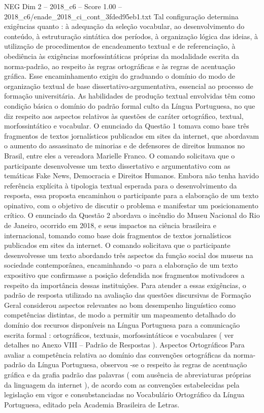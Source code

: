 \begin{textsample}{NEG Dim 2 – 2018\_c6 – Score 1.00 – 2018\_c6/enade\_2018\_ci\_cont\_3fded95eb1.txt}
Tal configuração determina exigências quanto : à adequação da seleção vocabular, ao desenvolvimento do conteúdo, à estruturação sintática dos períodos, à organização lógica das ideias, à utilização de procedimentos de encadeamento textual e de referenciação, à obediência às exigências morfossintáticas próprias da modalidade escrita da norma-padrão, ao respeito às regras ortográficas e às regras de acentuação gráfica.
Esse encaminhamento exigiu do graduando o domínio do modo de organização textual de base dissertativo-argumentativa, essencial ao processo de formação universitária.
As habilidades de produção textual envolvidas têm como condição básica o domínio do padrão formal culto da Língua Portuguesa, no que diz respeito aos aspectos relativos às questões de caráter ortográfico, textual, morfossintático e vocabular.
O enunciado da Questão 1 tomava como base três fragmentos de textos jornalísticos publicados em sites da internet, que abordavam o aumento do assassinato de minorias e de defensores de direitos humanos no Brasil, entre eles a vereadora Marielle Franco.
O comando solicitava que o participante desenvolvesse um texto dissertativo e argumentativo com as temáticas Fake News, Democracia e Direitos Humanos.
Embora não tenha havido referência explícita à tipologia textual esperada para o desenvolvimento da resposta, essa proposta encaminhou o participante para a elaboração de um texto opinativo, com o objetivo de discutir o problema e manifestar um posicionamento crítico.
O enunciado da Questão 2 abordava o incêndio do Museu Nacional do Rio de Janeiro, ocorrido em 2018, e seus impactos na ciência brasileira e internacional, tomando como base dois fragmentos de textos jornalísticos publicados em sites da internet.
O comando solicitava que o participante desenvolvesse um texto abordando três aspectos da função social dos museus na sociedade contemporânea, encaminhando -o para a elaboração de um texto expositivo que confirmasse a posição defendida nos fragmentos motivadores a respeito da importância dessas instituições.
Para atender a essas exigências, o padrão de resposta utilizado na avaliação das questões discursivas de Formação Geral considerou aspectos relevantes ao bom desempenho linguístico como competências distintas, de modo a permitir um mapeamento detalhado do domínio dos recursos disponíveis na Língua Portuguesa para a comunicação escrita formal : ortográficos, textuais, morfossintáticos e vocabulares ( ver detalhes no Anexo VIII – Padrão de Respostas ).
Aspectos Ortográficos Para avaliar a competência relativa ao domínio das convenções ortográficas da norma-padrão da Língua Portuguesa, observou -se o respeito às regras de acentuação gráfica e da grafia padrão das palavras ( com ausência de abreviaturas próprias da linguagem da internet ), de acordo com as convenções estabelecidas pela legislação em vigor e consubstanciadas no Vocabulário Ortográfico da Língua Portuguesa, editado pela Academia Brasileira de Letras.

\end{textsample}
